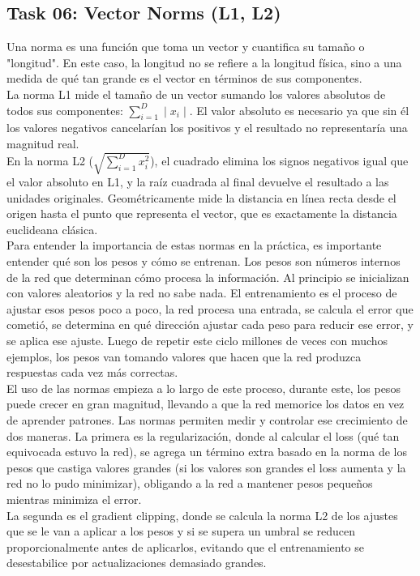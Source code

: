 ﻿\documentclass[12pt]{article}
\begin{document}
\subsection*{Task 06: Vector Norms (L1, L2)}
Una norma es una función que toma un vector y cuantifica su tamaño o "longitud". En este caso, la longitud no se 
refiere a la longitud física, sino a una medida de qué tan grande es el vector en términos de sus componentes. \\
La norma L1 mide el tamaño de un vector sumando los valores absolutos de todos sus componentes: $\displaystyle \sum_{i=1}^{D} \mid x_i \mid$.
El valor absoluto es necesario ya que sin él los valores negativos cancelarían los positivos y el resultado no representaría una magnitud real.\\
En la norma L2 \Bigg($\displaystyle \sqrt{\sum_{i=1}^{D} x_i^2}$\Bigg), el cuadrado elimina los signos negativos igual que el valor absoluto en L1, y la raíz cuadrada al final devuelve el resultado a las
unidades originales. Geométricamente mide la distancia en línea recta desde el origen hasta el punto que representa el vector, que es exactamente la 
distancia euclideana clásica. \\
Para entender la importancia de estas normas en la práctica, es importante entender qué son los pesos y cómo se entrenan. Los pesos son números internos
de la red que determinan cómo procesa la información. Al principio se inicializan con valores aleatorios y la red no sabe nada. El entrenamiento es el 
proceso de ajustar esos pesos poco a poco, la red procesa una entrada, se calcula el error que cometió, se determina en qué dirección ajustar cada peso 
para reducir ese error, y se aplica ese ajuste. Luego de repetir este ciclo millones de veces con muchos ejemplos, los pesos van tomando valores que hacen
que la red produzca respuestas cada vez más correctas.\\
El uso de las normas empieza a lo largo de este proceso, durante este, los pesos puede crecer en gran magnitud, llevando a que la red memorice los datos en vez
de aprender patrones. Las normas permiten medir y controlar ese crecimiento de dos maneras. La primera es la regularización, donde al calcular el loss (qué tan equivocada
estuvo la red), se agrega un término extra basado en la norma de los pesos que castiga valores grandes (si los valores son grandes el loss aumenta y la red no lo pudo minimizar),
obligando a la red a mantener pesos pequeños mientras minimiza el error. \\
La segunda es el gradient clipping, donde se calcula la norma L2 de los ajustes que se le van a aplicar a los pesos y si se supera un umbral se reducen proporcionalmente antes de
 aplicarlos, evitando que el entrenamiento se desestabilice por actualizaciones demasiado grandes. 
\end{document}
